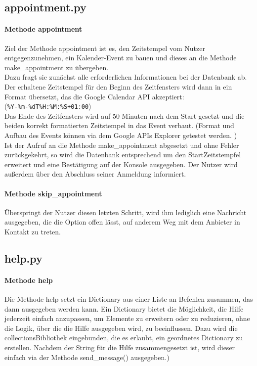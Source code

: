         \subsection{appointment.py}
            \paragraph{Methode appointment}
                Ziel der Methode appointment ist es, den Zeitstempel vom Nutzer entgegenzunehmen, ein Kalender-Event zu bauen und dieses an die Methode make\_appointment zu übergeben. \\
                Dazu fragt sie zunächst alle erforderlichen Informationen bei der Datenbank ab. Der erhaltene Zeitstempel für den Beginn des Zeitfensters wird dann in ein Format übersetzt, das die Google Calendar API akzeptiert: \\ (\verb/%Y-%m-%dT%H:%M:%S+01:00/) \\
                Das Ende des Zeitfensters wird auf 50 Minuten nach dem Start gesetzt und die beiden korrekt formatierten Zeitstempel in das Event verbaut. (Format und Aufbau des Events können via dem Google APIs Explorer getestet werden. \cite{apiExplorer}) \\
                Ist der Aufruf an die Methode make\_appointment abgesetzt und ohne Fehler zurückgekehrt, so wird die Datenbank entsprechend um den Start\-Zeitstempfel erweitert und eine Bestätigung auf der Konsole ausgegeben. Der Nutzer wird außerdem über den Abschluss seiner Anmeldung informiert. 

            \paragraph{Methode skip\_appointment}
                Überspringt der Nutzer diesen letzten Schritt, wird ihm lediglich eine Nachricht ausgegeben, die die Option offen lässt, auf anderem Weg mit dem Anbieter in Kontakt zu treten.

        
        \subsection{help.py}
            \paragraph{Methode help}
                Die Methode help setzt ein Dictionary aus einer Liste an Befehlen zusammen, das dann ausgegeben werden kann. Ein Dictionary bietet die Möglichkeit, die Hilfe jederzeit einfach anzupassen, um Elemente zu erweitern oder zu reduzieren, ohne die Logik, über die die Hilfe ausgegeben wird, zu beeinflussen. Dazu wird die collections\-Bibliothek eingebunden, die es erlaubt, ein geordnetes Dictionary zu erstellen. Nachdem der String für die Hilfe zusammengesetzt ist, wird dieser einfach via der Methode send\_message() ausgegeben.)


